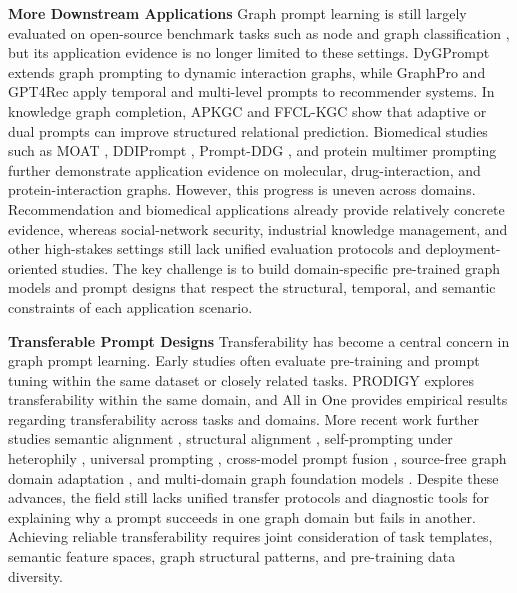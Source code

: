 \textbf{More Downstream Applications}
Graph prompt learning is still largely evaluated on open-source benchmark tasks such as node and graph classification \cite{hamilton2017inductive, xu2018how}, but its application evidence is no longer limited to these settings. DyGPrompt \cite{yu2025dygprompt} extends graph prompting to dynamic interaction graphs, while GraphPro \cite{yang2024graphpro} and GPT4Rec \cite{zhang2024gpt4rec} apply temporal and multi-level prompts to recommender systems. In knowledge graph completion, APKGC \cite{maoliniyazi2026apkgc} and FFCL-KGC \cite{zhu2026ffclkgc} show that adaptive or dual prompts can improve structured relational prediction. Biomedical studies such as MOAT \cite{long2024moat}, DDIPrompt \cite{wang2024ddiprompt}, Prompt-DDG \cite{wu2024promptddg}, and protein multimer prompting \cite{gao2024protein} further demonstrate application evidence on molecular, drug-interaction, and protein-interaction graphs. However, this progress is uneven across domains. Recommendation and biomedical applications already provide relatively concrete evidence, whereas social-network security, industrial knowledge management, and other high-stakes settings still lack unified evaluation protocols and deployment-oriented studies. The key challenge is to build domain-specific pre-trained graph models and prompt designs that respect the structural, temporal, and semantic constraints of each application scenario.



\textbf{Transferable Prompt Designs} 
Transferability has become a central concern in graph prompt learning. Early studies \cite{liu2023graphprompt, sun2022gppt, fang2023universal, fang2022prompt, ge2024psp} often evaluate pre-training and prompt tuning within the same dataset or closely related tasks. PRODIGY \cite{huang2023prodigy} explores transferability within the same domain, and All in One \cite{sun2023all} provides empirical results regarding transferability across tasks and domains. More recent work further studies semantic alignment \cite{zhu2023graphcontrol}, structural alignment \cite{zhao2023graphglow}, self-prompting under heterophily \cite{gong2024selfpro}, universal prompting \cite{huang2025oneprompt}, cross-model prompt fusion \cite{he2026gp2f}, source-free graph domain adaptation \cite{zhang2024collaborate}, and multi-domain graph foundation models \cite{wang2025multidomain, yu2025samgpt}. Despite these advances, the field still lacks unified transfer protocols and diagnostic tools for explaining why a prompt succeeds in one graph domain but fails in another. Achieving reliable transferability requires joint consideration of task templates, semantic feature spaces, graph structural patterns, and pre-training data diversity.




